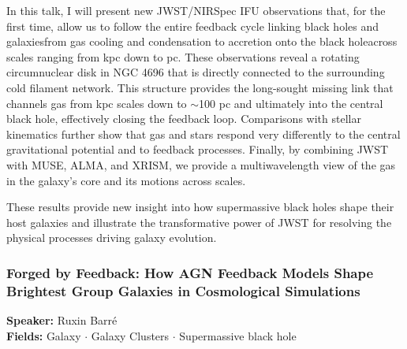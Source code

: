In this talk, I will present new JWST/NIRSpec IFU observations that, for the first time, allow us to follow the entire feedback cycle linking black holes and galaxiesfrom gas cooling and condensation to accretion onto the black holeacross scales ranging from kpc down to pc. These observations reveal a rotating circumnuclear disk in NGC 4696 that is directly connected to the surrounding cold filament network. This structure provides the long-sought missing link that channels gas from kpc scales down to $\sim$100 pc and ultimately into the central black hole, effectively closing the feedback loop. Comparisons with stellar kinematics further show that gas and stars respond very differently to the central gravitational potential and to feedback processes. Finally, by combining JWST with MUSE, ALMA, and XRISM, we provide a multiwavelength view of the gas in the galaxy's core and its motions across scales.

These results provide new insight into how supermassive black holes shape their host galaxies and illustrate the transformative power of JWST for resolving the physical processes driving galaxy evolution.

\hypertarget{abstract-talk-29}{}\label{abstract-page-talk-29}
\subsubsection*{Forged by Feedback: How AGN Feedback Models Shape Brightest Group Galaxies in Cosmological Simulations}
\textbf{Speaker:} Ruxin Barré\\
\textbf{Fields:} Galaxy $\cdot$ Galaxy Clusters $\cdot$ Supermassive black hole

